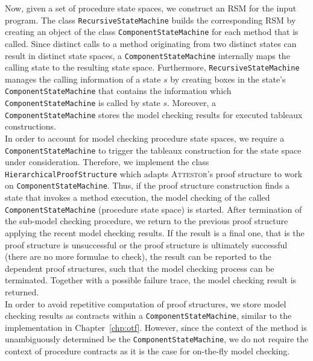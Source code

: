 \documentclass[a4paper, 12pt, twoside]{report}
\begin{document}
	Now, given a set of procedure state spaces, we construct an RSM for the input program. The class \texttt{RecursiveStateMachine} builds the corresponding RSM by creating an object of the class \texttt{ComponentStateMachine} for each method that is called. Since distinct calls to a method originating from two distinct states can result in distinct state spaces, a \texttt{ComponentStateMachine} internally maps the calling state to the resulting state space. Furthermore, \texttt{RecursiveStateMachine} manages the calling information of a state $s$ by creating boxes in the state's \texttt{ComponentStateMachine} that contains the information which \texttt{ComponentStateMachine} is called by state $s$. Moreover, a \texttt{ComponentStateMachine} stores the model checking results for executed tableaux constructions.\\
	
	In order to account for model checking procedure state spaces, we require a \texttt{ComponentStateMachine} to trigger the tableaux construction for the state space under consideration. Therefore, we implement the class \texttt{HierarchicalProofStructure} which adapts \textsc{Attestor}'s proof structure to work on \texttt{ComponentStateMachine}. Thus, if the proof structure construction finds a state that invokes a method execution, the model checking of the called \texttt{ComponentStateMachine} (procedure state space) is started. After termination of the sub-model checking procedure, we return to the previous proof structure applying the recent model checking results. If the result is a final one, that is the proof structure is unsuccessful or the proof structure is ultimately successful (there are no more formulae to check), the result can be reported to the dependent proof structures, such that the model checking process can be terminated. Together with a possible failure trace, the model checking result is returned.\\
	
	In order to avoid repetitive computation of proof structures, we store model checking results as contracts within a \texttt{ComponentStateMachine}, similar to the implementation in Chapter~\ref{chp:otf}. However, since the context of the method is unambiguously determined be the \texttt{ComponentStateMachine}, we do not require the context of procedure contracts as it is the case for on-the-fly model checking.
	
\end{document}
